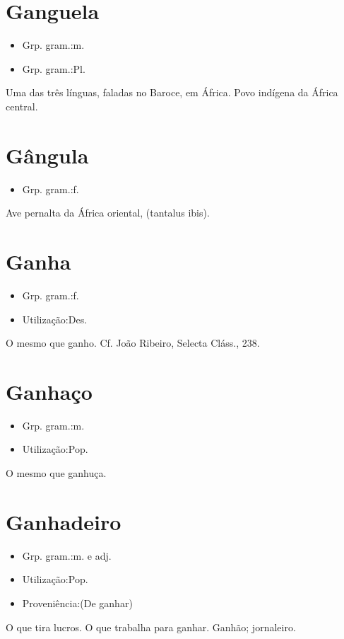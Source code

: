 \section{Ganguela}
\begin{itemize}
\item {Grp. gram.:m.}
\end{itemize}
\begin{itemize}
\item {Grp. gram.:Pl.}
\end{itemize}
Uma das três línguas, faladas no Baroce, em África.
Povo indígena da África central.
\section{Gângula}
\begin{itemize}
\item {Grp. gram.:f.}
\end{itemize}
Ave pernalta da África oriental, (\textunderscore tantalus ibis\textunderscore ).
\section{Ganha}
\begin{itemize}
\item {Grp. gram.:f.}
\end{itemize}
\begin{itemize}
\item {Utilização:Des.}
\end{itemize}
O mesmo que \textunderscore ganho\textunderscore . Cf. João Ribeiro, \textunderscore Selecta Cláss.\textunderscore , 238.
\section{Ganhaço}
\begin{itemize}
\item {Grp. gram.:m.}
\end{itemize}
\begin{itemize}
\item {Utilização:Pop.}
\end{itemize}
O mesmo que \textunderscore ganhuça\textunderscore .
\section{Ganhadeiro}
\begin{itemize}
\item {Grp. gram.:m.  e  adj.}
\end{itemize}
\begin{itemize}
\item {Utilização:Pop.}
\end{itemize}
\begin{itemize}
\item {Proveniência:(De \textunderscore ganhar\textunderscore )}
\end{itemize}
O que tira lucros.
O que trabalha para ganhar.
Ganhão; jornaleiro.
